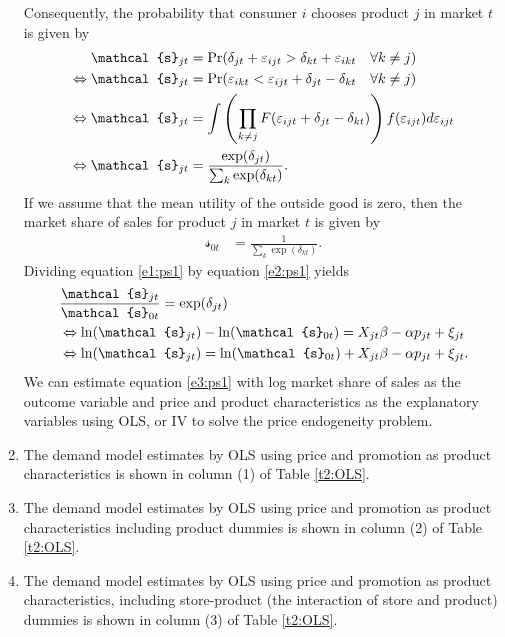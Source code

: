 \documentclass{article}
\begin{document}
\begin{enumerate}
Consequently, the probability that consumer $i$ chooses product $j$ in market $t$ is given by
\begin{align}
    \mathcal{s}_{jt}&=\Pr(\delta_{jt}+\varepsilon_{ijt}>\delta_{kt}+\varepsilon_{ikt} \quad \forall k\neq j) \notag\\
    \Leftrightarrow\mathcal{s}_{jt}&=\Pr(\varepsilon_{ikt}<\varepsilon_{ijt}+\delta_{jt}-\delta_{kt} \quad \forall k\neq j) \notag\\
    \Leftrightarrow\mathcal{s}_{jt}&=\int \left(\prod_{k\neq j} F(\varepsilon_{ijt}+\delta_{jt}-\delta_{kt})\right)f(\varepsilon_{ijt})d\varepsilon_{ijt} \notag\\
    \Leftrightarrow\mathcal{s}_{jt}&=\frac{\exp(\delta_{jt})}{\sum_{k}\exp(\delta_{kt})}.\label{e1:ps1}
\end{align}
If we assume that the mean utility of the outside good is zero, then the market share of sales for product $j$ in market $t$ is given by
\begin{align}
    \mathcal{s}_{0t}&=\frac{1}{\sum_{k}\exp(\delta_{kt})}.\label{e2:ps1}
\end{align}
Dividing equation \eqref{e1:ps1} by equation \eqref{e2:ps1} yields
\begin{align}
    &\frac{\mathcal{s}_{jt}}{\mathcal{s}_{0t}}=\exp(\delta_{jt})\notag\\
    &\Leftrightarrow \ln(\mathcal{s}_{jt})-\ln(\mathcal{s}_{0t})= X_{jt} \beta  - \alpha p_{jt}+ \xi_{jt}\notag \\
    &\Leftrightarrow \ln(\mathcal{s}_{jt})=\ln(\mathcal{s}_{0t}) + X_{jt} \beta  - \alpha p_{jt}+ \xi_{jt}.\label{e3:ps1} 
\end{align}
We can estimate equation \eqref{e3:ps1} with log market share of sales as the outcome variable and price and product characteristics as the explanatory variables using OLS, or IV to solve the price endogeneity problem. 
\item The demand model estimates by OLS using price and promotion as product characteristics is shown in column (1) of Table \ref{t2:OLS}.
\item The demand model estimates by OLS using price and promotion as product characteristics including product dummies is shown in column (2) of Table \ref{t2:OLS}.
\item The demand model estimates by OLS using price and promotion as product characteristics, including store-product (the interaction of store and product) dummies is shown in column (3) of Table \ref{t2:OLS}.


\end{enumerate}
\end{document}
